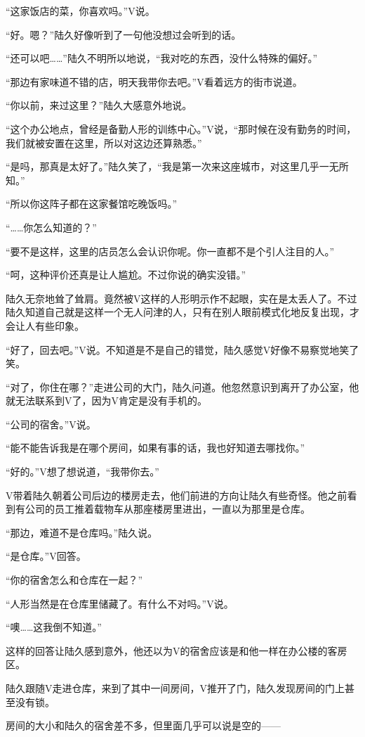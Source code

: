 “这家饭店的菜，你喜欢吗。”V说。

“好。嗯？”陆久好像听到了一句他没想过会听到的话。

“还可以吧……”陆久不明所以地说，“我对吃的东西，没什么特殊的偏好。”

“那边有家味道不错的店，明天我带你去吧。”V看着远方的街市说道。

“你以前，来过这里？”陆久大感意外地说。

“这个办公地点，曾经是备勤人形的训练中心。”V说，“那时候在没有勤务的时间，我们就被安置在这里，所以对这边还算熟悉。”

“是吗，那真是太好了。”陆久笑了，“我是第一次来这座城市，对这里几乎一无所知。”

“所以你这阵子都在这家餐馆吃晚饭吗。”

“……你怎么知道的？”

“要不是这样，这里的店员怎么会认识你呢。你一直都不是个引人注目的人。”

“呵，这种评价还真是让人尴尬。不过你说的确实没错。”

陆久无奈地耸了耸肩。竟然被V这样的人形明示作不起眼，实在是太丢人了。不过陆久知道自己就是这样一个无人问津的人，只有在别人眼前模式化地反复出现，才会让人有些印象。

“好了，回去吧。”V说。不知道是不是自己的错觉，陆久感觉V好像不易察觉地笑了笑。

“对了，你住在哪？”走进公司的大门，陆久问道。他忽然意识到离开了办公室，他就无法联系到V了，因为V肯定是没有手机的。

“公司的宿舍。”V说。

“能不能告诉我是在哪个房间，如果有事的话，我也好知道去哪找你。”

“好的。”V想了想说道，“我带你去。”

V带着陆久朝着公司后边的楼房走去，他们前进的方向让陆久有些奇怪。他之前看到有公司的员工推着载物车从那座楼房里进出，一直以为那里是仓库。

“那边，难道不是仓库吗。”陆久说。

“是仓库。”V回答。

“你的宿舍怎么和仓库在一起？”

“人形当然是在仓库里储藏了。有什么不对吗。”V说。

“噢……这我倒不知道。”

这样的回答让陆久感到意外，他还以为V的宿舍应该是和他一样在办公楼的客房区。

陆久跟随V走进仓库，来到了其中一间房间，V推开了门，陆久发现房间的门上甚至没有锁。

房间的大小和陆久的宿舍差不多，但里面几乎可以说是空的——

